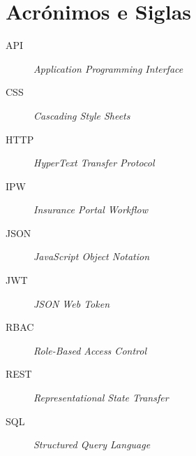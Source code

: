 \documentclass[a4paper,openright,twoside,11pt]{report}
\begin{document}

\cleardoublepage

\chapter*{Acrónimos e Siglas}
\begin{description}
  \item[API] \textit{Application Programming Interface}
  \item[CSS] \textit{Cascading Style Sheets}
  \item[HTTP] \textit{HyperText Transfer Protocol}
  \item[IPW] \textit{Insurance Portal Workflow}
  \item[JSON] \textit{JavaScript Object Notation}
  \item[JWT] \textit{JSON Web Token}
  \item[RBAC] \textit{Role-Based Access Control}
  \item[REST] \textit{Representational State Transfer}
  \item[SQL] \textit{Structured Query Language}
\end{description}
\cleardoublepage

\tableofcontents \cleardoublepage

\listoffigures \cleardoublepage

\setcounter{page}{1}









\cleardoublepage
{}

\nocite{visual-paradigm-bpmn}


%
\end{document}
